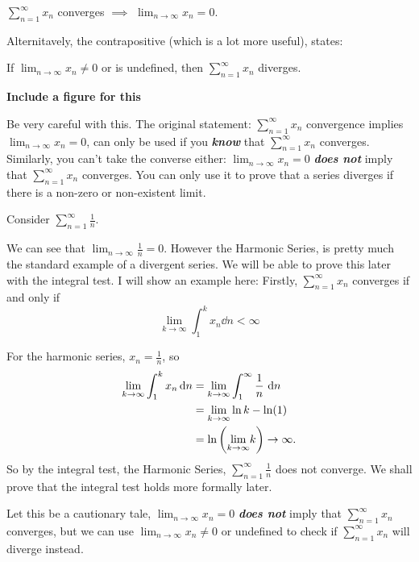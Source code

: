 \documentclass[12pt]{article}
\theoremstyle{definition}
\newcommand{\xseries}{\sum_{n = 1}^{\infty}x_{n}}
\newcommand{\nlim}{\lim_{n\rightarrow\infty}}
\begin{document}
            \begin{prop}
                $\xseries$ converges $\implies$ $\nlim x_{n} = 0$.

                Alternitavely, the contrapositive (which is a lot more useful), states:

                If $\nlim x_{n} \neq 0$ or is undefined, then $\xseries$ diverges.
            \end{prop}
            \textbf{Include a figure for this}
            \newpage
            \begin{note}
                Be very careful with this. The original statement: $\xseries$ convergence implies $\nlim x_{n} = 0$, can only be used if you \textbf{\emph{know}} that $\xseries$ converges. 
                Similarly, you can't take the converse either: $\nlim x_{n} = 0$ \textbf{\emph{ does not}} imply that $\xseries$ converges. You can only use it to prove that a series diverges if there is a non-zero or non-existent limit.
            \end{note}
            \begin{eg}
                Consider $\sum_{n = 1}^{\infty}\frac{1}{n}$.

                We can see that $\nlim \frac{1}{n} = 0$. However the Harmonic Series, is pretty much the standard example of a divergent series. We will be able to prove this later with the integral test. I will show an example here:
                Firstly, $\sum_{n = 1}^{\infty}x_{n}$ converges if and only if 
                \[
                    \lim_{k\rightarrow\infty}\int_{1}^{k}x_{n}\dd{n} < \infty
                \]

                For the harmonic series, $x_{n} = \frac{1}{n}$, so
                \begin{align*}
                    \lim_{k \rightarrow \infty}\int_{1}^{k}x_{n}\!\mathop{}\mathrm{d}{n} &= \lim_{k \rightarrow \infty}\int_{1}^{\infty}\frac{1}{n}\mathop{}\mathrm{d}{n} \\
                                                                            &= \lim_{k \rightarrow \infty}\ln{k} - \ln(1) \\
                                                                            &= \ln\left({\lim_{k \rightarrow \infty}}k\right) \rightarrow \infty.
                \end{align*}
                So by the integral test, the Harmonic Series, $\sum_{n = 1}^{\infty}\frac{1}{n}$ does not converge. We shall prove that the integral test holds more formally later.

                Let this be a cautionary tale, $\nlim x_{n} = 0$ \textbf{\emph{does not}} imply that $\xseries$ converges, but we can use $\nlim x_{n} \neq 0$ or undefined to check if $\xseries$ will diverge instead.
            \end{eg}
\end{document}
